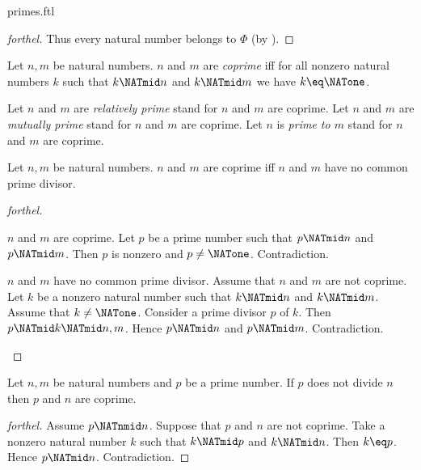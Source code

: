 \documentclass{stex}
\begin{document}
\begin{smodule}{primes.ftl}
\begin{proof}[forthel]
  Thus every natural number belongs to $\Phi$ (by ).
\end{proof}

\begin{definition}[forthel,id=ARITHMETIC_10_463197419077632]
  Let $n, m$ be natural numbers.
  $n$ and $m$ are \emph{coprime} iff for all nonzero natural numbers $k$ such that $k \NATmid n$ and $k \NATmid m$ we have $k \eq \NATone$.

  Let $n$ and $m$ are \emph{relatively prime} stand for $n$ and $m$ are coprime.
  Let $n$ and $m$ are \emph{mutually prime} stand for $n$ and $m$ are coprime.
  Let $n$ is \emph{prime to $m$} stand for $n$ and $m$ are coprime.
\end{definition}

\begin{proposition}[forthel,id=ARITHMETIC_10_5776394594287616]
  Let $n, m$ be natural numbers.
  $n$ and $m$ are coprime iff $n$ and $m$ have no common prime divisor.
\end{proposition}
\begin{proof}[forthel]
  \begin{case}{$n$ and $m$ are coprime.}
    Let $p$ be a prime number such that $p \NATmid n$ and $p \NATmid m$.
    Then $p$ is nonzero and $p \neq \NATone$.
    Contradiction.
  \end{case}

  \begin{case}{$n$ and $m$ have no common prime divisor.}
    Assume that $n$ and $m$ are not coprime.
    Let $k$ be a nonzero natural number such that $k \NATmid n$ and $k \NATmid m$.
    Assume that $k \neq \NATone$.
    Consider a prime divisor $p$ of $k$.
    Then $p \NATmid k \NATmid n,m$.
    Hence $p \NATmid n$ and $p \NATmid m$.
    Contradiction.
  \end{case}
\end{proof}

\begin{proposition}[forthel,id=ARITHMETIC_10_7212152851005440]
  Let $n, m$ be natural numbers and $p$ be a prime number.
  If $p$ does not divide $n$ then $p$ and $n$ are coprime.
\end{proposition}
\begin{proof}[forthel]
  Assume $p \NATnmid n$.
  Suppose that $p$ and $n$ are not coprime.
  Take a nonzero natural number $k$ such that $k \NATmid p$ and $k \NATmid n$.
  Then $k \eq p$.
  Hence $p \NATmid n$.
  Contradiction.
\end{proof}


\end{smodule}
\end{document}
